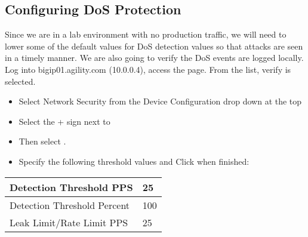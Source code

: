 \documentclass[letterpaper,10pt,english]{sphinxmanual}
\begin{document}
\subsection{Configuring DoS Protection}
\label{\detokenize{class1/module3/lab1:configuring-dos-protection}}
Since we are in a lab environment with no production traffic, we will
need to lower some of the default values for DoS detection values so
that attacks are seen in a timely manner. We are also going to verify
the DoS events are logged locally. Log into bigip01.agility.com
(10.0.0.4), access the 
 page. From the  list,
verify  is selected.

\begin{itemize}
\item {} 
Select Network Security from the Device Configuration drop down at
the top

\end{itemize}

\begin{itemize}
\item {} 
Select the + sign next to 

\item {} 
Then select .

\item {} 
Specify the following threshold values and Click  when
finished:

\end{itemize}


\begin{savenotes}\sphinxattablestart
\centering
\begin{tabulary}{\linewidth}[t]{|T|T|}
\hline

Detection Threshold PPS
&
25
\\
\hline
Detection Threshold Percent
&
100
\\
\hline
Leak Limit/Rate Limit PPS
&
25
\\
\hline
\end{tabulary}
\par
\sphinxattableend\end{savenotes}
\end{document}
